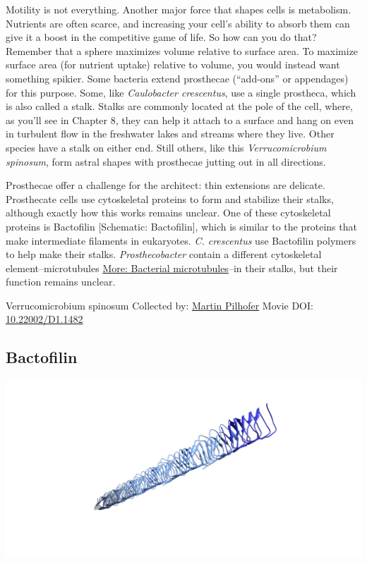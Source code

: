 \documentclass[]{tufte-book}
\begin{document}
Motility is not everything. Another major force that shapes cells is metabolism. Nutrients are often scarce, and increasing your cell's ability to absorb them can give it a boost in the competitive game of life. So how can you do that? Remember that a sphere maximizes volume relative to surface area. To maximize surface area (for nutrient uptake) relative to volume, you would instead want something spikier. Some bacteria extend prosthecae (``add-ons'' or appendages) for this purpose. Some, like \emph{Caulobacter crescentus}, use a single prostheca, which is also called a stalk. Stalks are commonly located at the pole of the cell, where, as you'll see in Chapter 8, they can help it attach to a surface and hang on even in turbulent flow in the freshwater lakes and streams where they live. Other species have a stalk on either end. Still others, like this \emph{Verrucomicrobium spinosum}, form astral shapes with prosthecae jutting out in all directions.

Prosthecae offer a challenge for the architect: thin extensions are delicate. Prosthecate cells use cytoskeletal proteins to form and stabilize their stalks, although exactly how this works remains unclear. One of these cytoskeletal proteins is Bactofilin {[}Schematic: Bactofilin{]}, which is similar to the proteins that make intermediate filaments in eukaryotes. \emph{C. crescentus} use Bactofilin polymers to help make their stalks. \emph{Prosthecobacter} contain a different cytoskeletal element--microtubules \protect\hyperlink{Bacterial_microtubules}{More: Bacterial microtubules}--in their stalks, but their function remains unclear.



\hypertarget{htmlwidget-aac8d05485aa189faa1e}{}

\label{fig:3-6}Verrucomicrobium spinosum Collected by: \protect\hyperlink{martin_pilhofer}{Martin Pilhofer} Movie DOI: \href{https://doi.org/10.22002/D1.1482}{10.22002/D1.1482}

\hypertarget{Bactofilin}{%
\subsection{Bactofilin}\label{Bactofilin}}

\includegraphics{img/schematics/3_6_1}
\end{document}
